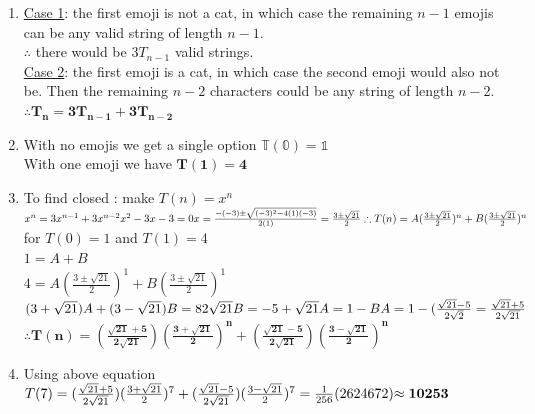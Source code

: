 \documentclass[11pt]{amsart}
\newcommand{\be}{\begin{enumerate}}
\newcommand{\ee}{\end{enumerate}}
\begin{document}
	\begin{sol}
		\be
			\item \underline{Case 1}: the first emoji is not a cat, in which case the remaining $n-1$ emojis can be any valid string of length $n-1$.\\
			$\therefore$ there would be $3T_{n-1}$ valid strings.\\
			\underline{Case 2}: the first emoji is a cat, in which case the second emoji would also not be. Then the remaining $n-2$ characters could be any string of length $n-2$.\\
			$\therefore \mathbf{T_n = 3T_{n-1} + 3T_{n-2}}$

			\item With no emojis we get a single option $\mathbb{T(0) = 1}$\\
			With one emoji we have $\mathbf{T(1) = 4}$

			\item To find closed : make $T(n) = x^n$\\
			$x^n = 3x^{n-1} + 3x^{n-2}\\
			x^2 - 3x -3 = 0\\
			x = \frac{-(-3) \pm \sqrt{(-3)^2 -4(1)(-3)}}{2(1)}\\
			= \frac{3 \pm \sqrt{21}}{2}\\
			\therefore T(n) = A(\frac{3 \pm \sqrt{21}}{2})^n + B(\frac{3 \pm \sqrt{21}}{2})^n$ for $T(0) = 1$ and $T(1) = 4$\\
			$1 = A + B$\\
			$4 = A(\frac{3 \pm \sqrt{21}}{2})^1 + B(\frac{3 \pm \sqrt{21}}{2})^1$\\
			$(3 + \sqrt{21})A + (3 - \sqrt{21})B = 8\\
			2 \sqrt{21} B = -5 + \sqrt{21}\\
			A = 1 - B\\
			A = 1 - (\frac{\sqrt{21} - 5}{2 \sqrt{2}}\\
			= \frac{\sqrt{21} + 5}{2 \sqrt{21}}$\\
			$\therefore \mathbf{T(n) = (\frac{\sqrt{21} + 5}{2 \sqrt{21}})(\frac{3 + \sqrt{21}}{2})^n + (\frac{\sqrt{21} - 5}{2 \sqrt{21}})(\frac{3 - \sqrt{21}}{2})^n}$

			\item Using above equation
			$T(7) = (\frac{\sqrt{21} + 5}{2 \sqrt{21}})(\frac{3 + \sqrt{21}}{2})^7 + (\frac{\sqrt{21} - 5}{2 \sqrt{21}})(\frac{3 - \sqrt{21}}{2})^7\\
			= \frac{1}{256}(2624672)\\
			\mathbf{\approx 10253}$
			
		\ee
	\end{sol}
\end{document}

